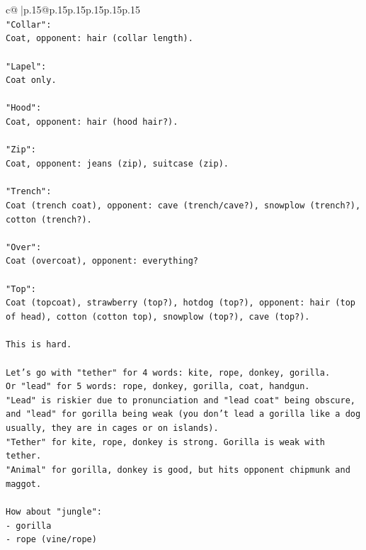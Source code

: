 \documentclass{article}
\begin{document}
{\begin{supertabular}{c@{$\;$}|p{.15\linewidth}@{}p{.15\linewidth}p{.15\linewidth}p{.15\linewidth}p{.15\linewidth}p{.15\linewidth}}
{{{\\ 
\texttt{"Collar":} \\
\texttt{Coat, opponent: hair (collar length).} \\
\\ 
\texttt{"Lapel":} \\
\texttt{Coat only.} \\
\\ 
\texttt{"Hood":} \\
\texttt{Coat, opponent: hair (hood hair?).} \\
\\ 
\texttt{"Zip":} \\
\texttt{Coat, opponent: jeans (zip), suitcase (zip).} \\
\\ 
\texttt{"Trench":} \\
\texttt{Coat (trench coat), opponent: cave (trench/cave?), snowplow (trench?), cotton (trench?).} \\
\\ 
\texttt{"Over":} \\
\texttt{Coat (overcoat), opponent: everything?} \\
\\ 
\texttt{"Top":} \\
\texttt{Coat (topcoat), strawberry (top?), hotdog (top?), opponent: hair (top of head), cotton (cotton top), snowplow (top?), cave (top?).} \\
\\ 
\texttt{This is hard.} \\
\\ 
\texttt{Let's go with "tether" for 4 words: kite, rope, donkey, gorilla.} \\
\texttt{Or "lead" for 5 words: rope, donkey, gorilla, coat, handgun.} \\
\texttt{"Lead" is riskier due to pronunciation and "lead coat" being obscure, and "lead" for gorilla being weak (you don't lead a gorilla like a dog usually, they are in cages or on islands).} \\
\texttt{"Tether" for kite, rope, donkey is strong. Gorilla is weak with tether.} \\
\texttt{"Animal" for gorilla, donkey is good, but hits opponent chipmunk and maggot.} \\
\\ 
\texttt{How about "jungle":} \\
\texttt{{-} gorilla} \\
\texttt{{-} rope (vine/rope)} \\
}}}
\end{supertabular}}
\end{document}
